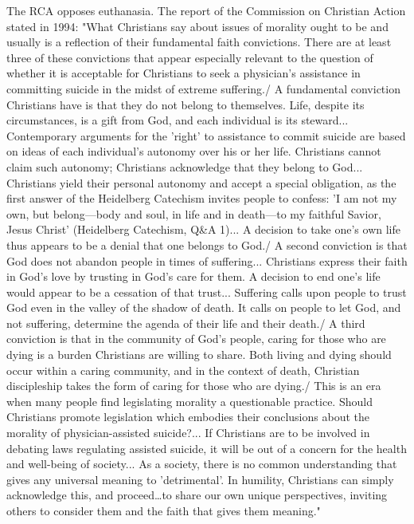 The RCA opposes euthanasia. The report of the Commission on Christian
Action stated in 1994: "What Christians say about issues of morality
ought to be and usually is a reflection of their fundamental faith
convictions. There are at least three of these convictions that appear
especially relevant to the question of whether it is acceptable for
Christians to seek a physician's assistance in committing suicide in the
midst of extreme suffering./ A fundamental conviction Christians have is
that they do not belong to themselves. Life, despite its circumstances,
is a gift from God, and each individual is its steward... Contemporary
arguments for the 'right' to assistance to commit suicide are based on
ideas of each individual's autonomy over his or her life. Christians
cannot claim such autonomy; Christians acknowledge that they belong to
God... Christians yield their personal autonomy and accept a special
obligation, as the first answer of the Heidelberg Catechism invites
people to confess: 'I am not my own, but belong---body and soul, in life
and in death---to my faithful Savior, Jesus Christ' (Heidelberg
Catechism, Q\&A 1)... A decision to take one's own life thus appears to
be a denial that one belongs to God./ A second conviction is that God
does not abandon people in times of suffering... Christians express
their faith in God's love by trusting in God's care for them. A decision
to end one's life would appear to be a cessation of that trust...
Suffering calls upon people to trust God even in the valley of the
shadow of death. It calls on people to let God, and not suffering,
determine the agenda of their life and their death./ A third conviction
is that in the community of God's people, caring for those who are dying
is a burden Christians are willing to share. Both living and dying
should occur within a caring community, and in the context of death,
Christian discipleship takes the form of caring for those who are
dying./ This is an era when many people find legislating morality a
questionable practice. Should Christians promote legislation which
embodies their conclusions about the morality of physician-assisted
suicide?... If Christians are to be involved in debating laws regulating
assisted suicide, it will be out of a concern for the health and
well-being of society... As a society, there is no common understanding
that gives any universal meaning to 'detrimental'. In humility,
Christians can simply acknowledge this, and proceed\ldots{}to share our
own unique perspectives, inviting others to consider them and the faith
that gives them meaning."


